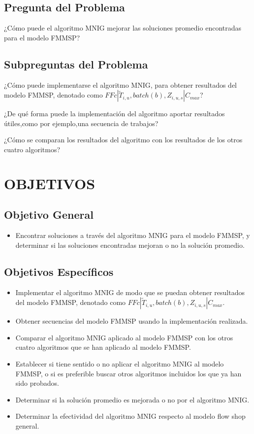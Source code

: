 \documentclass{article}
\def\notac_modelo{$FFc | \tilde{T}_{i, u}, batch(b), Z_{i, u, s} | C_{max}$}
\begin{document}
\subsection{Pregunta del Problema}

¿Cómo puede el algoritmo MNIG mejorar las soluciones promedio encontradas para el modelo FMMSP?

\subsection{Subpreguntas del Problema}

\indent\indent
¿Cómo puede implementarse el algoritmo MNIG, para obtener resultados del modelo FMMSP, denotado como \notac_modelo?

¿De qué forma puede la implementación del algoritmo aportar resultados útiles,como por ejemplo,una secuencia de trabajos?

¿Cómo se comparan los resultados del algoritmo con los resultados de los otros cuatro algoritmos?

\section{OBJETIVOS}

\subsection{Objetivo General}

\begin{itemize}
    \item Encontrar soluciones a través del algoritmo MNIG para el modelo FMMSP, y determinar si las soluciones encontradas mejoran o no la solución promedio.
\end{itemize}

\subsection{Objetivos Específicos}

\begin{itemize}
    \item Implementar el algoritmo MNIG de modo que se puedan obtener \linebreak resultados del modelo FMMSP, denotado como \linebreak \notac_modelo.
    \item Obtener secuencias del modelo FMMSP usando la implementación realizada.
    \item Comparar el algoritmo MNIG aplicado al modelo FMMSP con los otros cuatro algoritmos que se han aplicado al modelo FMMSP.
    \item Establecer si tiene sentido o no aplicar el algoritmo MNIG al modelo FMMSP, o si es preferible buscar otros algoritmos incluidos los que ya han sido probados.
    \item Determinar si la solución promedio es mejorada o no por el algoritmo MNIG.
    \item Determinar la efectividad del algoritmo MNIG respecto al modelo flow shop general.
\end{itemize}
\end{document}
